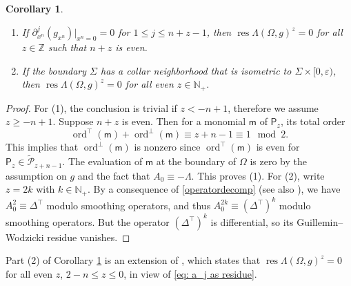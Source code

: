 \documentclass[11pt]{amsart}
\newcommand*{\res}{\operatorname{res}}
\newcommand{\ord}{\operatorname{ord}}
\newtheorem{corollary}[theorem]{Corollary}
\theoremstyle{definition}
\numberwithin{equation}{section}
\begin{document}
\begin{corollary}\label{cor: special manifolds}
    \begin{enumerate}
        \item If $\partial_{x^n}^j(g_{x^n})|_{x^n=0} = 0$ for $1\le j\le n+z-1$, then $\res \Lambda(\Omega,g)^z = 0$ for all  $z\in\mathbb Z$ such that $n+z$ is even.
        \item If the boundary $\Sigma$ has a collar neighborhood that is isometric to $\Sigma\times[0,\varepsilon)$, then $\res \Lambda(\Omega,g)^z = 0$ for all even $z\in\mathbb N_+$. 
    \end{enumerate}
\end{corollary}
\begin{proof}
    For (1), the conclusion is trivial if $z<-n+1$, therefore we  assume $z\ge -n+1$. Suppose $n+z$ is even. Then for a monomial $\mathsf m$ of $\mathsf P_{z}$, its total order 
    \[ \ord^\top(\mathsf m) + \ord^\bot(\mathsf m)\equiv z+n-1 \equiv 1 \mod 2.\] 
    This implies that $\ord^\bot(\mathsf m)$ is nonzero since $\ord^\top(\mathsf m)$ is even for $\mathsf P_{z} \in\widetilde{\mathcal P}_{z+n-1}$. The evaluation of $\mathsf m$ at the boundary of $\Omega$ is zero by the assumption on $g$ and the fact that $A_0\equiv-\Lambda$. This proves (1). For (2), write $z=2k$ with $k\in\mathbb N_+$. By a consequence of \eqref{operatordecomp} (see also \cite[Theorem 2.1]{leeBFKGluingFormula2003}), we have $A_0^2\equiv\Delta^\top$ modulo smoothing operators, and thus $A_0^{2k}\equiv(\Delta^\top)^k$ modulo smoothing operators. But the operator $(\Delta^\top)^k$ is differential, so its Guillemin--Wodzicki residue vanishes. 
\end{proof}
   
Part (2) of Corollary \ref{cor: special manifolds} is an extension of \cite[Corollary 3.7]{polterovichHeatInvariantsSteklov2015}, which states that $\res \Lambda(\Omega,g)^z = 0$ for all even $z$, $2-n\le z\le 0$, in view of \eqref{eq: a_j as residue}. 
\end{document}
